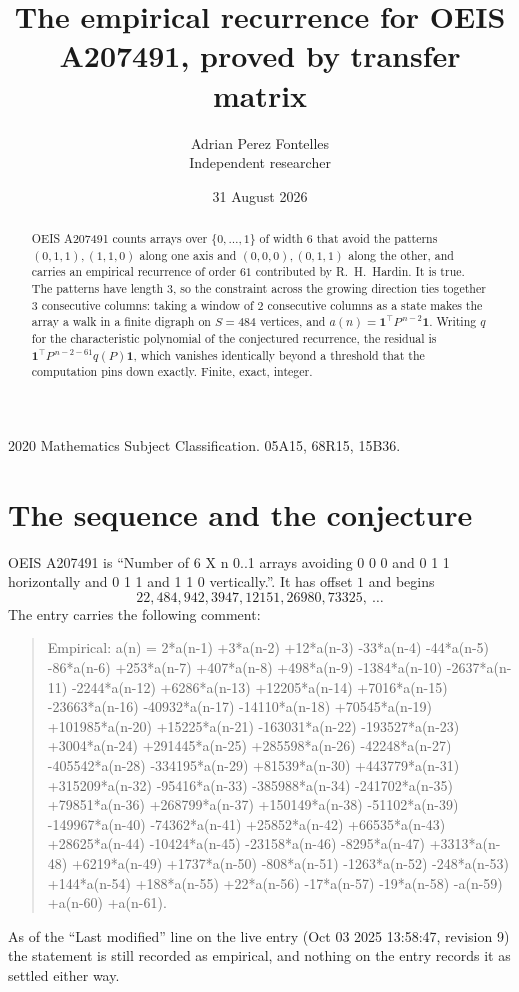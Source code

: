 \documentclass[11pt,a4paper]{article}
\title{The empirical recurrence for OEIS A207491, proved by transfer matrix}
\author{Adrian Perez Fontelles\\ \small Independent researcher}
\date{31 August 2026}
\theoremstyle{plain}
\theoremstyle{definition}
\begin{document}
\maketitle

\begin{abstract}
OEIS A207491 counts arrays over $\{0,\dots,1\}$ of width $6$ that avoid the patterns
$(0,1,1), (1,1,0)$ along one axis and $(0,0,0), (0,1,1)$ along the other, and carries an empirical recurrence of
order $61$ contributed by R.~H.~Hardin. It is true. The patterns have length $3$, so
the constraint across the growing direction ties together $3$ consecutive columns: taking a
window of $2$ consecutive columns as a state makes the array a walk in a finite digraph
on $S=484$ vertices, and $a(n)=\mathbf{1}^{\!\top}P^{\,n-2}\mathbf{1}$. Writing $q$
for the characteristic polynomial of the conjectured recurrence, the residual is
$\mathbf{1}^{\!\top}P^{\,n-2-61}q(P)\mathbf{1}$, which vanishes identically
beyond a threshold that the computation pins down exactly. Finite, exact, integer.
\end{abstract}

\noindent\small 2020 Mathematics Subject Classification. 05A15, 68R15, 15B36.\normalsize

\section{The sequence and the conjecture}

OEIS A207491 is ``Number of 6 X n 0..1 arrays avoiding 0 0 0 and 0 1 1 horizontally and 0 1 1 and 1 1 0 vertically.''. It has offset
$1$ and begins
\[
22, 484, 942, 3947, 12151, 26980, 73325,\ \dots
\]
The entry carries the following comment:
\begin{quote}\small
Empirical: a(n) = 2*a(n-1) +3*a(n-2) +12*a(n-3) -33*a(n-4) -44*a(n-5) -86*a(n-6) +253*a(n-7) +407*a(n-8) +498*a(n-9) -1384*a(n-10) -2637*a(n-11) -2244*a(n-12) +6286*a(n-13) +12205*a(n-14) +7016*a(n-15) -23663*a(n-16) -40932*a(n-17) -14110*a(n-18) +70545*a(n-19) +101985*a(n-20) +15225*a(n-21) -163031*a(n-22) -193527*a(n-23) +3004*a(n-24) +291445*a(n-25) +285598*a(n-26) -42248*a(n-27) -405542*a(n-28) -334195*a(n-29) +81539*a(n-30) +443779*a(n-31) +315209*a(n-32) -95416*a(n-33) -385988*a(n-34) -241702*a(n-35) +79851*a(n-36) +268799*a(n-37) +150149*a(n-38) -51102*a(n-39) -149967*a(n-40) -74362*a(n-41) +25852*a(n-42) +66535*a(n-43) +28625*a(n-44) -10424*a(n-45) -23158*a(n-46) -8295*a(n-47) +3313*a(n-48) +6219*a(n-49) +1737*a(n-50) -808*a(n-51) -1263*a(n-52) -248*a(n-53) +144*a(n-54) +188*a(n-55) +22*a(n-56) -17*a(n-57) -19*a(n-58) -a(n-59) +a(n-60) +a(n-61).
\end{quote}
As of the ``Last modified'' line on the live entry (Oct 03 2025 13:58:47, revision
9) the statement is still recorded as empirical, and nothing on the entry
records it as settled either way.
\end{document}
